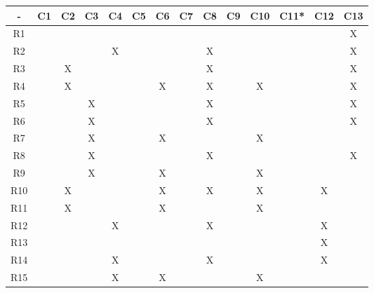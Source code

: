 \begin{table}[H]
\centering
\begin{tabular}{|c|c|c|c|c|c|c|c|c|c|c|c|c|c|} 
\hline
\rowcolor[rgb]{0.71,0.102,0} -     & C1 & C2 & C3 & C4 & C5 & C6 & C7 & C8 & C9 & C10 & C11* & C12 & C13  \\ 
\hline
{\cellcolor[rgb]{0.71,0.102,0}}R1  &    &    &    &    &    &    &    &    &    &     &      &     & X    \\ 
\hline
{\cellcolor[rgb]{0.71,0.102,0}}R2  &    &    &    & X  &    &    &    & X  &    &     &      &     & X    \\ 
\hline
{\cellcolor[rgb]{0.71,0.102,0}}R3  &    & X  &    &    &    &    &    & X  &    &     &      &     & X    \\ 
\hline
{\cellcolor[rgb]{0.71,0.102,0}}R4  &    & X  &    &    &    & X  &    & X  &    & X   &      &     & X    \\ 
\hline
{\cellcolor[rgb]{0.71,0.102,0}}R5  &    &    & X  &    &    &    &    & X  &    &     &      &     & X    \\ 
\hline
{\cellcolor[rgb]{0.71,0.102,0}}R6  &    &    & X  &    &    &    &    & X  &    &     &      &     & X    \\ 
\hline
{\cellcolor[rgb]{0.71,0.102,0}}R7  &    &    & X  &    &    & X  &    &    &    & X   &      &     &      \\ 
\hline
{\cellcolor[rgb]{0.71,0.102,0}}R8  &    &    & X  &    &    &    &    & X  &    &     &      &     & X    \\ 
\hline
{\cellcolor[rgb]{0.71,0.102,0}}R9  &    &    & X  &    &    & X  &    &    &    & X   &      &     &      \\ 
\hline
{\cellcolor[rgb]{0.71,0.102,0}}R10 &    & X  &    &    &    & X  &    & X  &    & X   &      & X   &      \\ 
\hline
{\cellcolor[rgb]{0.71,0.102,0}}R11 &    & X  &    &    &    & X  &    &    &    & X   &      &     &      \\ 
\hline
{\cellcolor[rgb]{0.71,0.102,0}}R12 &    &    &    & X  &    &    &    & X  &    &     &      & X   &      \\ 
\hline
{\cellcolor[rgb]{0.71,0.102,0}}R13 &    &    &    &    &    &    &    &    &    &     &      & X   &      \\ 
\hline
{\cellcolor[rgb]{0.71,0.102,0}}R14 &    &    &    & X  &    &    &    & X  &    &     &      & X   &      \\ 
\hline
{\cellcolor[rgb]{0.71,0.102,0}}R15 &    &    &    & X  &    & X  &    &    &    & X   &      &     &      \\ 

\end{tabular}
\end{table}
